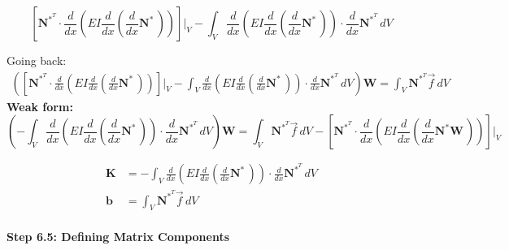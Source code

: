 \documentclass{article}
\begin{document}
\begin{equation}
    \left [
    \mathbf{N}^*^T\cdot
    \frac{d}{dx}\left(EI\frac{d}{dx}\left(\frac{d}{dx} \mathbf{N}^*\,\right)\right)
    \right ]\bigg |_V
    -
    \int_V
    \frac{d}{dx}\left(EI\frac{d}{dx}\left(\frac{d}{dx} \mathbf{N}^*\,\right)\right)\cdot
    \frac{d}{dx} \mathbf{N}^*^T\,dV
\end{equation}

\newpage

{\Large Going back:}
\begin{gather}
  \label{eq-tfrac}
    \left (
    \left [
    \mathbf{N}^*^T\cdot
    \frac{d}{dx}\left(EI\frac{d}{dx}\left(\frac{d}{dx} \mathbf{N}^*\,\right)\right)
    \right ]\bigg |_V
    -
    \int_V
    \frac{d}{dx}\left(EI\frac{d}{dx}\left(\frac{d}{dx} \mathbf{N}^*\,\right)\right)\cdot
    \frac{d}{dx} \mathbf{N}^*^T\,dV
    \right ) \mathbf{W} =
    \int_V
    \mathbf{N}^*^T\vec{f}\,dV
\end{gather}
\textbf{Weak form:}
\begin{equation}
    \left(
    -
    \int_V
    \frac{d}{dx}\left(EI\frac{d}{dx}\left(\frac{d}{dx} \mathbf{N}^*\,\right)\right)\cdot
    \frac{d}{dx} \mathbf{N}^*^T\,dV
    \right)\mathbf{W}=
    \int_V
    \mathbf{N}^*^T\vec{f}\,dV
    -
    \left [
    \mathbf{N}^*^T\cdot
    \frac{d}{dx}\left(EI\frac{d}{dx}\left(\frac{d}{dx} \mathbf{N}^*\mathbf{W}\,\right)\right)
    \right ]\bigg |_V
\end{equation}

\begin{align}
    \mathbf{K}&=
    -\int_V
    \frac{d}{dx}\left(EI\frac{d}{dx}\left(\frac{d}{dx} \mathbf{N}^*\,\right)\right)\cdot
    \frac{d}{dx} \mathbf{N}^*^T\,dV
    \\
    \mathbf{b}&=
    \int_V
    \mathbf{N}^*^T\vec{f}\,dV
\end{align}
\\
\textbf{Step 6.5: Defining Matrix Components}
\end{document}
